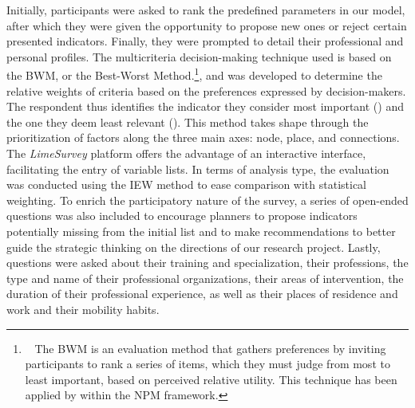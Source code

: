 \begin{refsegment}
Initially, participants were asked to rank the predefined parameters in our model, after which they were given the opportunity to propose new ones or reject certain presented indicators. Finally, they were prompted to detail their professional and personal profiles. The multicriteria decision-making technique used is based on the \acrfull{BWM}, or the Best-Worst Method.\footnote{~
    The \acrfull{BWM} is an evaluation method that gathers preferences by inviting participants to rank a series of items, which they must judge from most to least important, based on perceived relative utility. This technique has been applied by \textcolor{blue}{\textcite[8]{groenendijk_incorporating_2018}} within the \acrshort{NPM} framework.
}, and was developed to determine the relative weights of criteria based on the preferences expressed by decision-makers. The respondent thus identifies the indicator they consider most important () and the one they deem least relevant (). This method takes shape through the prioritization of factors along the three main axes: node, place, and connections. The \textsl{LimeSurvey} platform offers the advantage of an interactive interface, facilitating the entry of variable lists. In terms of analysis type, the evaluation was conducted using the \acrshort{IEW} method to ease comparison with statistical weighting. To enrich the participatory nature of the survey, a series of open-ended questions was also included to encourage planners to propose indicators potentially missing from the initial list and to make recommendations to better guide the strategic thinking on the directions of our research project. Lastly, questions were asked about their training and specialization, their professions, the type and name of their professional organizations, their areas of intervention, the duration of their professional experience, as well as their places of residence and work and their mobility habits.%


\end{refsegment}
